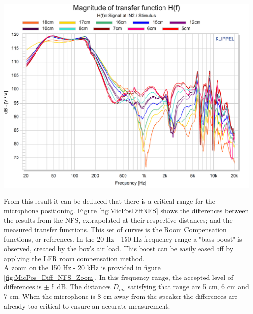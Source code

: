 \documentclass{report}
\begin{document}
\begin{minipage}{0.6\textwidth}
\begin{center}
	\includegraphics[width=1\textwidth]{RoomComp/MicPos_TRF} 
    \captionsetup{hypcap=false} 
	\label{fig:MicPosTRF}
\end{center}
\end{minipage}
\vspace{0.1cm} 


From this result it can be deduced that there is a critical range for the microphone positioning. Figure \ref{fig:MicPosDiffNFS} shows the differences between the results from the NFS, extrapolated at their respective distances; and the measured transfer functions. This set of curves is the Room Compensation functions, or references. In the 20 Hz - 150 Hz frequency range a "bass boost" is observed, created by the box's air load. This boost can be easily eased off by applying the LFR room compensation method.\\
A zoom on the 150 Hz - 20 kHz is provided in figure \ref{fig:MicPos_Diff_NFS_Zoom}. In this frequency range, the accepted level of differences is $\pm$ 5 dB. The distances $D_{ms}$ satisfying that range are 5 cm, 6 cm and 7 cm. When the microphone is 8 cm away from the speaker the differences are already too critical to ensure an accurate measurement. \\
\end{document}
